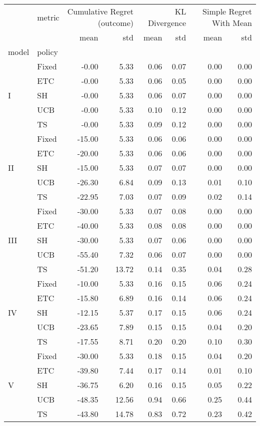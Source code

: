 \begin{tabular}{llrrrrrr}
 & metric & \multicolumn{2}{r}{Cumulative Regret (outcome)} & \multicolumn{2}{r}{KL Divergence} & \multicolumn{2}{r}{Simple Regret With Mean} \\
 &  & mean & std & mean & std & mean & std \\
model & policy &  &  &  &  &  &  \\
\multirow[c]{5}{*}{I} & Fixed & -0.00 & 5.33 & 0.06 & 0.07 & 0.00 & 0.00 \\
 & ETC & -0.00 & 5.33 & 0.06 & 0.05 & 0.00 & 0.00 \\
 & SH & -0.00 & 5.33 & 0.06 & 0.07 & 0.00 & 0.00 \\
 & UCB & -0.00 & 5.33 & 0.10 & 0.12 & 0.00 & 0.00 \\
 & TS & -0.00 & 5.33 & 0.09 & 0.12 & 0.00 & 0.00 \\
\multirow[c]{5}{*}{II} & Fixed & -15.00 & 5.33 & 0.06 & 0.06 & 0.00 & 0.00 \\
 & ETC & -20.00 & 5.33 & 0.06 & 0.06 & 0.00 & 0.00 \\
 & SH & -15.00 & 5.33 & 0.07 & 0.07 & 0.00 & 0.00 \\
 & UCB & -26.30 & 6.84 & 0.09 & 0.13 & 0.01 & 0.10 \\
 & TS & -22.95 & 7.03 & 0.07 & 0.09 & 0.02 & 0.14 \\
\multirow[c]{5}{*}{III} & Fixed & -30.00 & 5.33 & 0.07 & 0.08 & 0.00 & 0.00 \\
 & ETC & -40.00 & 5.33 & 0.08 & 0.08 & 0.00 & 0.00 \\
 & SH & -30.00 & 5.33 & 0.07 & 0.06 & 0.00 & 0.00 \\
 & UCB & -55.40 & 7.32 & 0.06 & 0.07 & 0.00 & 0.00 \\
 & TS & -51.20 & 13.72 & 0.14 & 0.35 & 0.04 & 0.28 \\
\multirow[c]{5}{*}{IV} & Fixed & -10.00 & 5.33 & 0.16 & 0.15 & 0.06 & 0.24 \\
 & ETC & -15.80 & 6.89 & 0.16 & 0.14 & 0.06 & 0.24 \\
 & SH & -12.15 & 5.37 & 0.17 & 0.15 & 0.06 & 0.24 \\
 & UCB & -23.65 & 7.89 & 0.15 & 0.15 & 0.04 & 0.20 \\
 & TS & -17.55 & 8.71 & 0.20 & 0.20 & 0.10 & 0.30 \\
\multirow[c]{5}{*}{V} & Fixed & -30.00 & 5.33 & 0.18 & 0.15 & 0.04 & 0.20 \\
 & ETC & -39.80 & 7.44 & 0.17 & 0.14 & 0.01 & 0.10 \\
 & SH & -36.75 & 6.20 & 0.16 & 0.15 & 0.05 & 0.22 \\
 & UCB & -48.35 & 12.56 & 0.94 & 0.66 & 0.25 & 0.44 \\
 & TS & -43.80 & 14.78 & 0.83 & 0.72 & 0.23 & 0.42 \\
\end{tabular}
